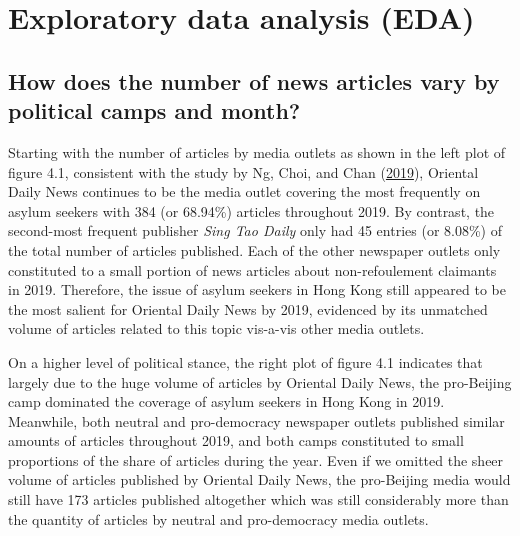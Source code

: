 \documentclass[a4paper, oneside]{report}
\begin{document}
\hypertarget{exploratory-data-analysis-eda}{%
\section{Exploratory data analysis
(EDA)}\label{exploratory-data-analysis-eda}}

\hypertarget{how-does-the-number-of-news-articles-vary-by-political-camps-and-month}{%
\subsection{How does the number of news articles vary by political camps
and
month?}\label{how-does-the-number-of-news-articles-vary-by-political-camps-and-month}}

Starting with the number of articles by media outlets as shown in the
left plot of figure 4.1, consistent with the study by Ng, Choi, and Chan
(\protect\hyperlink{ref-ngFramingIssueAsylum2019}{2019}), Oriental Daily
News continues to be the media outlet covering the most frequently on
asylum seekers with 384 (or 68.94\%) articles throughout 2019. By
contrast, the second-most frequent publisher \emph{Sing Tao Daily} only
had 45 entries (or 8.08\%) of the total number of articles published.
Each of the other newspaper outlets only constituted to a small portion
of news articles about non-refoulement claimants in 2019. Therefore, the
issue of asylum seekers in Hong Kong still appeared to be the most
salient for Oriental Daily News by 2019, evidenced by its unmatched
volume of articles related to this topic vis-a-vis other media outlets.

On a higher level of political stance, the right plot of figure 4.1
indicates that largely due to the huge volume of articles by Oriental
Daily News, the pro-Beijing camp dominated the coverage of asylum
seekers in Hong Kong in 2019. Meanwhile, both neutral and pro-democracy
newspaper outlets published similar amounts of articles throughout 2019,
and both camps constituted to small proportions of the share of articles
during the year. Even if we omitted the sheer volume of articles
published by Oriental Daily News, the pro-Beijing media would still have
173 articles published altogether which was still considerably more than
the quantity of articles by neutral and pro-democracy media outlets.
\end{document}
